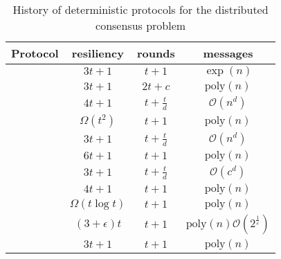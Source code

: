 \begin{table}[H]
\centering
\begin{tabular}{||l|c|c|c||}
\hline 
Protocol & resiliency & rounds & messages \\ \hline\hline
\cite{LSP82} & $3t+1$ &  $t+1$  & $\exp(n)$ \\ \hline
\cite{DFFLS82,TPS85} & $3t+1$ &  $2t+c$  & $\text{poly}(n)$ \\ \hline
\cite{Coa86} & $4t+1$ &  $t+\frac{t}{d}$  & $\mathcal{O}(n^d)$ \\ \hline
\cite{DRS90,BD91,Coa93} & $\Omega(t^2)$ &  $t+1$  & $\text{poly}(n)$ \\ \hline
\cite{BDDS87} & $3t+1$ &  $t+\frac{t}{d}$  & $\mathcal{O}(n^d)$ \\ \hline
\cite{MW88} & $6t+1$ &  $t+1$  & $\text{poly}(n)$ \\ \hline
\cite{BGP89} & $3t+1$ &  $t+\frac{t}{d}$  & $\mathcal{O}(c^d)$ \\ \hline
\cite{BG89} & $4t+1$ &  $t+1$  & $\text{poly}(n)$ \\ \hline
\cite{CW92} & $\Omega(t\log t)$ &  $t+1$  & $\text{poly}(n)$ \\ \hline
\cite{BG91} & $(3+\epsilon)t$ &  $t+1$  & $\text{poly}(n)\mathcal{O}(2^{\frac{1}{e}})$ \\ \hline
\cite{GM98} & $3t+1$ &  $t+1$  & $\text{poly}(n)$ \\ \hline
\end{tabular}
\caption{History of deterministic protocols for the distributed consensus problem}
\label{tab:det_protocols}
\end{table}

